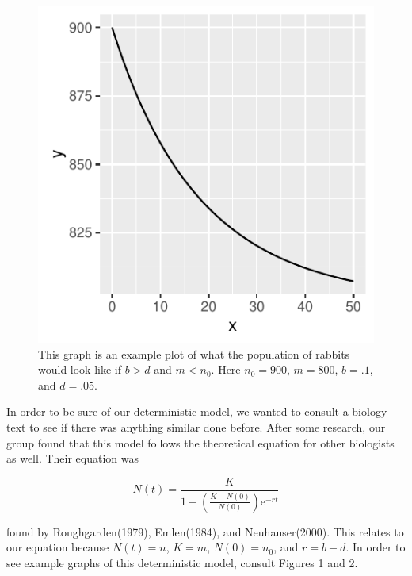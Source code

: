\documentclass{article}\usepackage[]{graphicx}\usepackage[]{color}
\makeatletter
\def\maxwidth{ %
  \ifdim\Gin@nat@width>\linewidth
    \linewidth
  \else
    \Gin@nat@width
  \fi
}
\newenvironment{knitrout}{}{} %
\makeatother
\begin{document}
\begin{figure}
\begin{knitrout}
\color{fgcolor}

{\centering \includegraphics[width=\maxwidth]{figure/unnamed-chunk-3-1} 

}



\end{knitrout}
\caption{This graph is an example plot of what the population of rabbits would look like if \(b > d\) and \(m < n_0\). Here \(n_0 = 900\), \(m = 800\), \(b = .1\), and \(d = .05\).}
\end{figure}

In order to be sure of our deterministic model, we wanted to consult a biology text to see if there was anything similar done before. After some research, our group found that this model follows the theoretical equation for other biologists as well. Their equation was 

\begin{equation}
N(t) = \frac{K}{1+(\frac{K-N(0)}{N(0)})\mathrm{e}^{-rt}}
\end{equation}

\noindent found by Roughgarden(1979), Emlen(1984), and Neuhauser(2000). This relates to our equation because \(N(t) = n\), \(K=m\), \(N(0)=n_0\), and \(r = b-d\). In order to see example graphs of this deterministic model, consult Figures 1 and 2.
\end{document}
